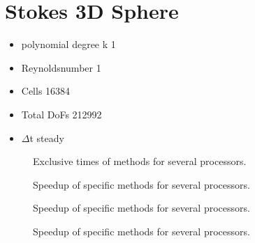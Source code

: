 \documentclass{article}
\begin{document}
\section*{Stokes 3D Sphere}
\begin{itemize}
	\large \item  polynomial degree k 1
	\item Reynoldsnumber 1
	\item Cells 16384
	\item Total DoFs 212992
	\item $\Delta$t steady
\end{itemize}
	\begin{figure}
		\hspace{-2cm}
		\rule{0cm}{1.1cm}
		\caption{Exclusive times of methods for several processors.}
	\end{figure}
	\begin{figure}
		\hspace{-2cm}
		\rule{0cm}{1.1cm}
		\caption{Speedup of specific methods for several processors.}
	\end{figure}
		\begin{figure}
		\hspace{-2cm}
		\rule{0cm}{1.1cm}
		\caption{Speedup of specific methods for several processors.}
		\end{figure}
		\begin{figure}
			\hspace{-2cm}
			\rule{0cm}{1.1cm}
			\caption{Speedup of specific methods for several processors.}
		\end{figure}
\end{document}
